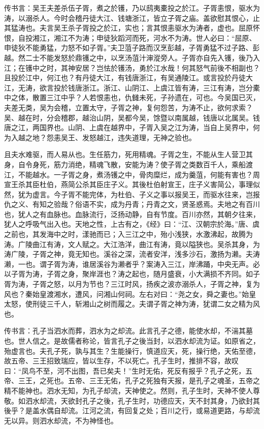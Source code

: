 \documentclass[]{article}
\begin{document}
传书言：吴王夫差杀伍子胥，煮之於镬，乃以鸱夷橐投之於江。子胥恚恨，驱水为涛，以溺杀人。今时会稽丹徒大江、钱塘浙江，皆立子胥之庙。盖欲慰其恨心，止其猛涛也。夫言吴王杀子胥投之於江，实也；言其恨恚驱水为涛者，虚也。屈原怀恨，自投湘江，湘江不为涛；申徒狄蹈河而死，河水不为涛。世人必曰：``屈原、申徒狄不能勇猛，力怒不如子胥。''夫卫菹子路而汉烹彭越，子胥勇猛不过子路、彭越。然二士不能发怒於鼎镬之中，以烹汤菹汁渖漎旁人。子胥亦自先入镬，後乃入江；在镬中之时，其神安居？岂怯於镬汤，勇於江水哉！何其怒气前後不相副也？且投於江中，何江也？有丹徒大江，有钱唐浙江，有吴通陵江。或言投於丹徒大江，无涛，欲言投於钱唐浙江。浙江、山阴江、上虞江皆有涛，三江有涛，岂分橐中之体，散置三江中乎？人若恨恚也，仇雠未死，子孙遗在，可也。今吴国已灭，夫差无类，吴为会稽，立置太守，子胥之神，复何怨苦，为涛不止，欲何求索？吴、越在时，分会稽郡，越治山阴，吴都今吴，馀暨以南属越，钱唐以北属吴。钱唐之江，两国界也。山阴、上虞在越界中，子胥入吴之江为涛，当自上吴界中，何为入越之地？怨恚吴王、发怒越江，违失道理，无神之验也。

且夫水难驱，而人易从也。生任筋力，死用精魂。子胥之生，不能从生人营卫其身，自令身死，筋力消绝，精魂飞散，安能为涛？使子胥之类数百千人，乘船渡江，不能越水。一子胥之身，煮汤镬之中，骨肉糜烂，成为羹菹，何能有害也？周宣王杀其臣杜伯，燕简公杀其臣庄子义。其後杜伯射宣王，庄子义害简公，事理似然，犹为虚言。今子胥不能完体，为杜伯、子义之事以报吴王，而驱水往来，岂报仇之义、有知之验哉？俗语不实，成为丹青；丹青之文，贤圣惑焉。夫地之有百川也，犹人之有血脉也。血脉流行，泛扬动静，自有节度。百川亦然，其朝夕往来，犹人之呼吸气出入也。天地之性，上古有之，《经》曰：``江、汉朝宗於海。''唐、虞之前也，其发海中之时，漾驰而已；入三江之中，殆小浅狭，水激沸起，故腾为涛。广陵曲江有涛，文人赋之。大江浩洋，曲江有涛，竟以隘狭也。吴杀其身，为涛广陵，子胥之神，竟无知也。溪谷之深，流者安洋，浅多沙石，激扬为濑。夫涛濑，一也。谓子胥为涛，谁居溪谷为濑者乎？案涛入三江，岸沸踊，中央无声。必以子胥为涛，子胥之身，聚岸涯也？涛之起也，随月盛衰，小大满损不齐同。如子胥为涛，子胥之怒，以月为节也？三江时风，扬疾之波亦溺杀人，子胥之神，复为风也？秦始皇渡湘水，遭风，问湘山何祠。左右对曰：``尧之女，舜之妻也。''始皇太怒，使刑徒三千人，斩湘山之树而履之。夫谓子胥之神为涛，犹谓二女之精为风也。

传书言：孔子当泗水而葬，泗水为之却流。此言孔子之德，能使水却，不湍其墓也。世人信之。是故儒者称论，皆言孔子之後当封，以泗水却流为证。如原省之，殆虚言也。夫孔子死，孰与其生？生能操行，慎道应天，死，操行绝，天佑至德，故五帝、三王招致瑞应，皆以生存，不以死亡。孔子生时，推排不容，故叹曰：``凤鸟不至，河不出图，吾已矣夫！''生时无佑，死反有报乎？孔子之死，五帝、三王，之死也。五帝、三王无佑，孔子之死独有天报，是孔子之魂圣，五帝之精不能神也。泗水无知，为孔子却流，天神使之。然则，孔子生时，天神不使人尊敬。如泗水却流，天欲封孔子之後，孔子生时，功德应天，天不封其身，乃欲封其後乎？是盖水偶自却流。江河之流，有回复之处；百川之行，或易道更路，与却流无以异。则泗水却流，不为神怪也。
\end{document}
